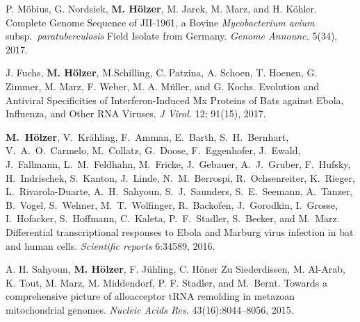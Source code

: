 \documentclass[a4paper,10pt]{article} %
\begin{document}
\begin{small}

P. Möbius, G. Nordsiek, \textbf{M. Hölzer}, M. Jarek, M. Marz, and H. Köhler.
Complete Genome Sequence of JII-1961, a Bovine \emph{Mycobacterium avium} subsp.\ \emph{paratuberculosis} Field Isolate from Germany.
\emph{Genome Announc.} 5(34), 2017. 

J. Fuchs, \textbf{M. Hölzer}, M.Schilling, C. Patzina, A. Schoen, T. Hoenen, G. Zimmer, M. Marz, F. Weber, M. A. Müller, and G. Kochs.
Evolution and Antiviral Specificities of Interferon-Induced Mx Proteins of Bats against Ebola, Influenza, and Other RNA Viruses.
\emph{J Virol.} 12; 91(15), 2017. 

\textbf{M.~H\"olzer}, V.~Kr\"ahling, F.~Amman, E.~Barth, S.~H.~Bernhart, V.~A.~O.~Carmelo,  M.~Collatz, G.~Doose, F.~Eggenhofer, J.~Ewald, J.~Fallmann, L.~M.~Feldhahn, M.~Fricke, J.~Gebauer, A.~J.~Gruber, F.~Hufsky, H.~Indrischek, S.~Kanton, J.~Linde, N.~M.~Berrospi, R.~Ochsenreiter, K.~Rieger, L.~Rivarola-Duarte, A.~H.~Sahyoun, S.~J.~Saunders, S.~E.~Seemann, A.~Tanzer, B.~Vogel, S.~Wehner, M.~T.~Wolfinger, R.~Backofen, J.~Gorodkin, I.~Grosse, I.~Hofacker, S.~Hoffmann, C.~Kaleta, P.~F.~Stadler, S.~Becker, and M.~Marz.
Differential transcriptional responses to Ebola and Marburg virus infection in bat and human cells.
\emph{Scientific reports} 6:34589, 2016.

A. H. Sahyoun, \textbf{M. Hölzer}, F. Jühling, C. Höner Zu Siederdissen, M. Al-Arab, K. Tout, M. Marz, M. Middendorf, P. F. Stadler, and M.~Bernt. 
Towards a comprehensive picture of alloacceptor {tRNA} remolding in metazoan mitochondrial genomes. 
\emph{Nucleic Acids Res.} 43(16):8044--8056, 2015.

\end{small}





\end{document}
